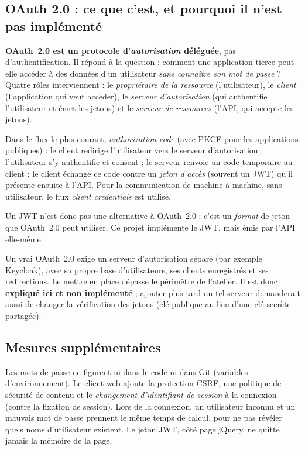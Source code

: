 \documentclass[11pt,a4paper]{article}
\begin{document}
\subsection{OAuth 2.0 : ce que c'est, et pourquoi il n'est pas implémenté}
\textbf{OAuth~2.0 est un protocole d'\emph{autorisation} déléguée}, pas d'authentification. Il répond à la question : comment une application tierce peut-elle accéder à des données d'un utilisateur \emph{sans connaître son mot de passe} ? Quatre rôles interviennent : le \emph{propriétaire de la ressource} (l'utilisateur), le \emph{client} (l'application qui veut accéder), le \emph{serveur d'autorisation} (qui authentifie l'utilisateur et émet les jetons) et le \emph{serveur de ressources} (l'API, qui accepte les jetons).

Dans le flux le plus courant, \emph{authorization code} (avec PKCE pour les applications publiques) : le client redirige l'utilisateur vers le serveur d'autorisation ; l'utilisateur s'y authentifie et consent ; le serveur renvoie un code temporaire au client ; le client échange ce code contre un \emph{jeton d'accès} (souvent un JWT) qu'il présente ensuite à l'API. Pour la communication de machine à machine, sans utilisateur, le flux \emph{client credentials} est utilisé.

Un JWT n'est donc pas une alternative à OAuth~2.0 : c'est un \emph{format} de jeton que OAuth~2.0 peut utiliser. Ce projet implémente le JWT, mais émis par l'API elle-même.

\begin{vigilance}
Un vrai OAuth~2.0 exige un serveur d'autorisation séparé (par exemple Keycloak), avec sa propre base d'utilisateurs, ses clients enregistrés et ses redirections. Le mettre en place dépasse le périmètre de l'atelier. Il est donc \textbf{expliqué ici et non implémenté} ; ajouter plus tard un tel serveur demanderait aussi de changer la vérification des jetons (clé publique au lieu d'une clé secrète partagée).
\end{vigilance}

\subsection{Mesures supplémentaires}
Les mots de passe ne figurent ni dans le code ni dans Git (variables d'environnement). Le client web ajoute la protection CSRF, une politique de sécurité de contenu et le \emph{changement d'identifiant de session} à la connexion (contre la fixation de session). Lors de la connexion, un utilisateur inconnu et un mauvais mot de passe prennent le même temps de calcul, pour ne pas révéler quels noms d'utilisateur existent. Le jeton JWT, côté page jQuery, ne quitte jamais la mémoire de la page.
\end{document}

